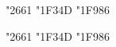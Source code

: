 \documentclass{article}
\begin{document}
     \Emojinature \char"2661 \char"1F34D \char"1F986

     \Emojicolor \char"2661 \char"1F34D \char"1F986
\end{document}
